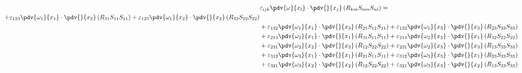 \begin{equation}
	\begin{split}
		 & \varepsilon_{ijk}\pdv{\omega}{x_{l}} \cdot\pdv{}{x_{j}}\left(R_{km}S_{mn}S_{nl}\right) =  \\ 
		+\varepsilon_{123}\pdv{\omega_{1}}{x_{1}}\cdot\pdv{}{x_{2}}\left(R_{31}S_{11}S_{11}\right)
		+\varepsilon_{123}\pdv{\omega_{1}}{x_{2}}\cdot\pdv{}{x_{2}}\left(R_{32}S_{22}S_{22}\right)
		\\ 
&+\varepsilon_{132}\pdv{\omega_{1}}{x_{1}}\cdot\pdv{}{x_{3}}\left(R_{21}S_{11}S_{11}\right)
		+\varepsilon_{132}\pdv{\omega_{1}}{x_{3}}\cdot\pdv{}{x_{3}}\left(R_{23}S_{33}S_{33}\right)
		\\ 
&+\varepsilon_{213}\pdv{\omega_{2}}{x_{1}}\cdot\pdv{}{x_{1}}\left(R_{31}S_{11}S_{11}\right)
		+\varepsilon_{213}\pdv{\omega_{2}}{x_{2}}\cdot\pdv{}{x_{1}}\left(R_{32}S_{22}S_{22}\right)
		\\ 
&+\varepsilon_{231}\pdv{\omega_{2}}{x_{2}}\cdot\pdv{}{x_{3}}\left(R_{12}S_{22}S_{22}\right)
		+\varepsilon_{231}\pdv{\omega_{2}}{x_{3}}\cdot\pdv{}{x_{3}}\left(R_{13}S_{33}S_{33}\right)
		\\ 
&+\varepsilon_{312}\pdv{\omega_{3}}{x_{1}}\cdot\pdv{}{x_{1}}\left(R_{21}S_{11}S_{11}\right)
		+\varepsilon_{312}\pdv{\omega_{3}}{x_{3}}\cdot\pdv{}{x_{1}}\left(R_{23}S_{33}S_{33}\right)
		\\ 
&+\varepsilon_{321}\pdv{\omega_{3}}{x_{2}}\cdot\pdv{}{x_{2}}\left(R_{12}S_{22}S_{22}\right)
		+\varepsilon_{321}\pdv{\omega_{3}}{x_{3}}\cdot\pdv{}{x_{2}}\left(R_{13}S_{33}S_{33}\right)
	\end{split}
\end{equation}
